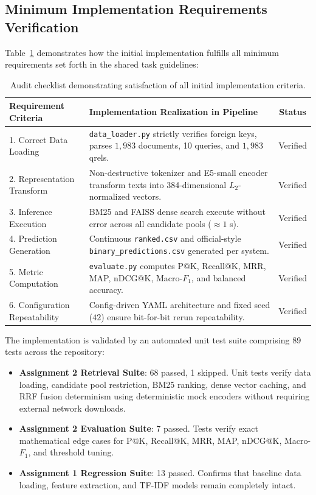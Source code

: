 \subsection{Minimum Implementation Requirements Verification}
Table~\ref{tab:min_impl_checklist} demonstrates how the initial implementation fulfills all minimum requirements set forth in the shared task guidelines:

\begin{table}[H]
\centering
\small
\begin{tabular}{lp{6.8cm}c}
\toprule
\textbf{Requirement Criteria} & \textbf{Implementation Realization in Pipeline} & \textbf{Status} \\
\midrule
1. Correct Data Loading & \texttt{data\_loader.py} strictly verifies foreign keys, parses $1,983$ documents, 10 queries, and $1,983$ qrels. & Verified \\
2. Representation Transform & Non-destructive tokenizer and E5-small encoder transform texts into 384-dimensional $L_2$-normalized vectors. & Verified \\
3. Inference Execution & BM25 and FAISS dense search execute without error across all candidate pools ($\approx 1$ s). & Verified \\
4. Prediction Generation & Continuous \texttt{ranked.csv} and official-style \texttt{binary\_predictions.csv} generated per system. & Verified \\
5. Metric Computation & \texttt{evaluate.py} computes P@K, Recall@K, MRR, MAP, nDCG@K, Macro-$F_1$, and balanced accuracy. & Verified \\
6. Configuration Repeatability & Config-driven YAML architecture and fixed seed ($42$) ensure bit-for-bit rerun repeatability. & Verified \\
\bottomrule
\end{tabular}
\caption{Audit checklist demonstrating satisfaction of all initial implementation criteria.}
\label{tab:min_impl_checklist}
\end{table}
The implementation is validated by an automated unit test suite comprising 89 tests across the repository:
\begin{itemize}
    \item \textbf{Assignment 2 Retrieval Suite}: 68 passed, 1 skipped. Unit tests verify data loading, candidate pool restriction, BM25 ranking, dense vector caching, and RRF fusion determinism using deterministic mock encoders without requiring external network downloads.
    \item \textbf{Assignment 2 Evaluation Suite}: 7 passed. Tests verify exact mathematical edge cases for P@K, Recall@K, MRR, MAP, nDCG@K, Macro-$F_1$, and threshold tuning.
    \item \textbf{Assignment 1 Regression Suite}: 13 passed. Confirms that baseline data loading, feature extraction, and TF-IDF models remain completely intact.
\end{itemize}

